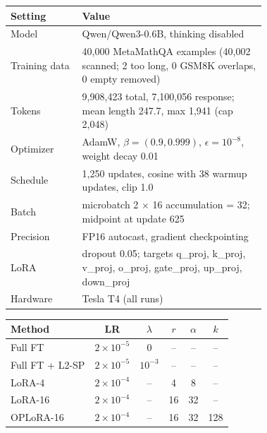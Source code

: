 \begin{tabular}{lp{0.72\linewidth}}
\toprule
Setting & Value \\
\midrule
Model & Qwen/Qwen3-0.6B, thinking disabled \\
Training data & 40,000 MetaMathQA examples (40,002 scanned; 2 too long, 0 GSM8K overlaps, 0 empty removed) \\
Tokens & 9,908,423 total, 7,100,056 response; mean length 247.7, max 1,941 (cap 2,048) \\
Optimizer & AdamW, $\beta=(0.9, 0.999)$, $\epsilon=10^{-8}$, weight decay 0.01 \\
Schedule & 1,250 updates, cosine with 38 warmup updates, clip 1.0 \\
Batch & microbatch 2 $\times$ 16 accumulation = 32; midpoint at update 625 \\
Precision & FP16 autocast, gradient checkpointing \\
LoRA & dropout 0.05; targets q\_proj, k\_proj, v\_proj, o\_proj, gate\_proj, up\_proj, down\_proj \\
Hardware & Tesla T4 (all runs) \\
\bottomrule
\end{tabular}

\vspace{4pt}

\begin{tabular}{lccccc}
\toprule
Method & LR & $\lambda$ & $r$ & $\alpha$ & $k$ \\
\midrule
Full FT & $2\times10^{-5}$ & 0 & -- & -- & -- \\
Full FT + L2-SP & $2\times10^{-5}$ & $10^{-3}$ & -- & -- & -- \\
LoRA-4 & $2\times10^{-4}$ & -- & 4 & 8 & -- \\
LoRA-16 & $2\times10^{-4}$ & -- & 16 & 32 & -- \\
OPLoRA-16 & $2\times10^{-4}$ & -- & 16 & 32 & 128 \\
\bottomrule
\end{tabular}